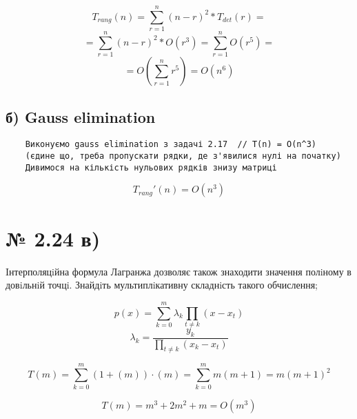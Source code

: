 \documentclass[11pt, a4paper]{article} %
\begin{document}
$$T_{rang}(n) = \sum_{r=1}^n (n-r)^2 * T_{det}(r) = $$
$$= \sum_{r=1}^n (n-r)^2 * O(r^3) = \sum_{r=1}^n O(r^5) = $$
$$= O(\sum_{r=1}^n r^5) = O(n^6)$$


\subsection*{б) Gauss elimination}
\begin{lstlisting}
    Виконуємо gauss elimination з задачі 2.17  // T(n) = O(n^3)
    (єдине що, треба пропускати рядки, де з'явилися нулі на початку)
    Дивимося на кількість нульових рядків знизу матриці
\end{lstlisting}

$$T_{rang}'(n) = O(n^3)$$

\section*{№ 2.24 в)}
\begin{mdframed}
    Iнтерполяцiйна формула Лагранжа дозволяє також знаходити значення полiному в
довiльнiй точцi. Знайдiть мультиплiкативну складнiсть такого обчислення;
\end{mdframed}

$$p(x) = \sum_{k=0}^m \lambda_k \prod_{t\ne k} (x-x_t)$$
$$\lambda_k = \frac{y_k}{\displaystyle \prod_{t\ne k}(x_k - x_t)}$$

$$T(m) = \sum_{k=0}^m (1 + (m)) \cdot (m) = \sum_{k=0}^m m(m+1) = m(m+1)^2$$

$$T(m) = m^3 + 2m^2 + m = O(m^3)$$
\end{document}
